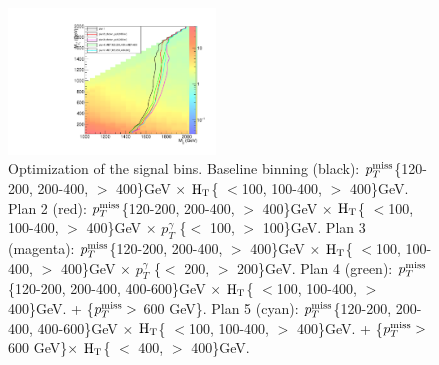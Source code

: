 \documentclass[thesis.tex]{subfiles}
\renewcommand\_{\textunderscore\allowbreak}
\begin{document}
\begin{figure}[htb]
  \centering
    \includegraphics[width=0.49\textwidth]{Figures/binningOpt.pdf}
		\caption{Optimization of the signal bins. Baseline binning (black): $p_T^\textrm{miss}$\{120-200, 200-400, $ >$ 400\}GeV $\times$ $\textrm{H}_\textrm{T}$\{ $<$100, 100-400, $ >$ 400\}GeV. Plan 2 (red): $p_T^\textrm{miss}$\{120-200, 200-400, $ >$ 400\}GeV $\times$ $\textrm{H}_\textrm{T}$\{ $<$100, 100-400, $ >$ 400\}GeV $\times$ $p_T^\gamma$ \{$<$ 100, $>$ 100\}GeV. Plan 3 (magenta): $p_T^\textrm{miss}$\{120-200, 200-400, $ >$ 400\}GeV $\times$ $\textrm{H}_\textrm{T}$\{ $<$100, 100-400, $ >$ 400\}GeV $\times$ $p_T^\gamma$ \{$<$ 200, $>$ 200\}GeV. Plan 4 (green): $p_T^\textrm{miss}$\{120-200, 200-400, 400-600\}GeV $\times$ $\textrm{H}_\textrm{T}$\{ $<$100, 100-400, $ >$ 400\}GeV. + \{$p_T^\textrm{miss} > $ 600 GeV\}. Plan 5 (cyan): $p_T^\textrm{miss}$\{120-200, 200-400, 400-600\}GeV $\times$ $\textrm{H}_\textrm{T}$\{ $<$100, 100-400, $ >$ 400\}GeV. + \{$p_T^\textrm{miss} > $ 600 GeV\}$\times$ $\textrm{H}_\textrm{T}$\{ $<$ 400, $ >$ 400\}GeV. }
    \label{fig:optbin}
\end{figure}
\end{document}

